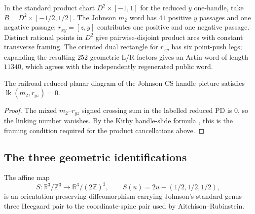 In the standard product chart $D^2\times[-1,1]$ for the reduced $y$
one-handle, take $B=D^2\times[-1/2,1/2]$.  The Johnson $m_2$ word has $41$
positive $y$ passages and one negative passage; $r_{xy}=[z,y]$ contributes one
positive and one negative passage.  Distinct rational points in $D^2$ give
pairwise-disjoint product arcs with constant transverse framing.  The oriented
dual rectangle for $r_{xy}$ has six point-push legs; expanding the resulting
$252$ geometric L/R factors gives an Artin word of length $11340$, which
agrees with the independently regenerated public word.

\begin{lemma}\label{lem:P0d-link}
The railroad reduced planar diagram of the Johnson CS handle picture satisfies
$\operatorname{lk}(m_2,r_{yz})=0$.
\end{lemma}

\begin{proof}
The mixed $m_2$--$r_{yz}$ signed crossing sum in the labelled reduced PD is
$0$, so the linking number vanishes.  By the Kirby handle-slide formula
\cite{Kirby1978}, this is the framing condition required for the product
cancellations above.
\end{proof}

\subsection{The three geometric identifications}

\begin{lemma}\label{lem:P0a}
The affine map
\[
S:\mathbb R^3/\mathbb Z^3\longrightarrow
\mathbb R^3/(2\mathbb Z)^3,\qquad
S(u)=2u-(1/2,1/2,1/2),
\]
is an orientation-preserving diffeomorphism carrying Johnson's standard
genus-three Heegaard pair to the coordinate-spine pair used by
Aitchison--Rubinstein.
\end{lemma}

